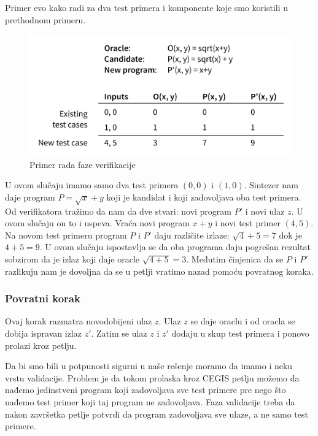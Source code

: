 Primer evo kako radi za dva test primera i komponente koje smo koristili u prethodnom primeru.

\begin{figure}[t]
    \begin{center}
        \includegraphics[scale=0.6]{resources/oracle-table.png}
    \end{center}
    \caption{Primer rada faze verifikacije}
    \label{fig:oraclePrimer1}
\end{figure}

U ovom slučaju imamo samo dva test primera $(0,0)$ i $(1,0)$. Sintezer nam daje program $P=\sqrt{x}+y$ koji je kandidat i koji zadovoljava oba test primera. Od verifikatora tražimo da nam da dve stvari: novi program $P'$ i novi ulaz $z$. U ovom slučaju on to i uspeva. Vraća novi program $x+y$ i novi test primer $(4,5)$. Na novom test primeru program $P$ i $P'$ daju različite izlaze: $\sqrt{4}+5=7$ dok je $4+5=9$. U ovom slučaju ispostavlja se da oba programa daju pogrešan rezultat sobzirom da je izlaz koji daje oracle $\sqrt{4+5}=3$. Međutim činjenica da se $P$ i $P'$ razlikuju nam je dovoljna da se u petlji vratimo nazad pomoću povratnog koraka.


\subsubsection{Povratni korak}

Ovaj korak razmatra novodobijeni ulaz $z$. Ulaz $z$ se daje oraclu i od oracla se dobija ispravan izlaz $z'$. Zatim se ulaz $z$ i $z'$ dodaju u skup test primera i ponovo prolazi kroz petlju.

Da bi smo bili u potpunosti sigurni u naše rešenje moramo da imamo i neku vrstu validacije. Problem je da tokom prolaska kroz CEGIS petlju možemo da nađemo jedinstveni program koji zadovoljava sve test primere pre nego što nađemo test primer koji taj program ne zadovoljava. Faza validacije treba da nakon završetka petlje potvrdi da program zadovoljava sve ulaze, a ne samo test primere.


